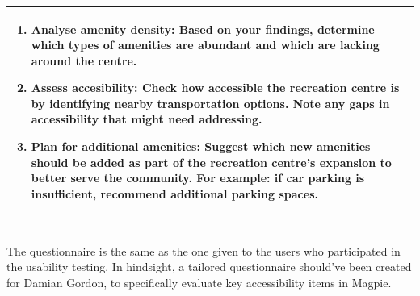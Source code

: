\begin{table}[h!]
\begin{tabular}{|p{}|}
\begin{enumerate}
            \item \textbf{Analyse amenity density:} Based on your findings, determine which types of amenities are abundant and which are lacking around the centre.
            \item \textbf{Assess accesibility:} Check how accessible the recreation centre is by identifying nearby transportation options. Note any gaps in accessibility that might need addressing.
            \item \textbf{Plan for additional amenities:} Suggest which new amenities should be added as part of the recreation centre's expansion to better serve the community. For example: if car parking is insufficient, recommend additional parking spaces.
        \end{enumerate}                                              \\
        \hline
    \end{tabular}
\end{table}
\\
The questionnaire is the same as the one given to the users who participated in the usability testing. In hindsight, a tailored questionnaire should've been created for Damian Gordon, to specifically evaluate key accessibility items in Magpie.

